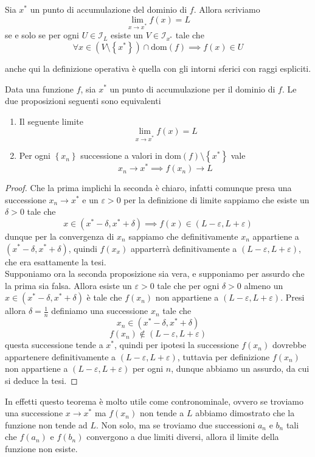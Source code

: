 \documentclass[11pt]{scrartcl}
\begin{document}
	\begin{definition}
		Sia $x^*$ un punto di accumulazione del dominio di $f$. Allora scriviamo 
		$$\lim_{x\to x^*}f(x)=L$$
		se e solo se per ogni $U\in\mathcal{I}_{L}$ esiste un $V\in \mathcal{I}_{x^*}$ tale che 
		$$\forall x\in (V\setminus\left\{x^*\right\})\cap \text{dom}(f) \implies f(x)\in U$$
	\end{definition}
	anche qui la definizione operativa è quella con gli intorni sferici con raggi espliciti. 
	\begin{theorem}\label{limite di funzione dai limiti di successione}
		Data una funzione $f$, sia $x^*$ un punto di accumulazione per il dominio di $f$. Le due proposizioni seguenti sono equivalenti
		\begin{enumerate}
			\item Il seguente limite 
			$$\lim_{x\to x^*}f(x)=L$$
			\item Per ogni $\left\{x_n\right\}$ successione a valori in $\text{dom}(f)\setminus\left\{x^*\right\}$ vale
			$$x_n\to x^* \implies f(x_n)\to L$$
		\end{enumerate}
	\end{theorem}
	\begin{proof}
		Che la prima implichi la seconda è chiaro, infatti comunque presa una successione $x_n\to x^*$ e un $\varepsilon>0$ per la definizione di limite sappiamo che esiste un $\delta>0$ tale che 
		$$x\in (x^*-\delta,x^*+\delta) \implies f(x)\in (L-\varepsilon,L+\varepsilon)$$
		dunque per la convergenza di $x_n$ sappiamo che definitivamente $x_n$ appartiene a $(x^*-\delta,x^*+\delta)$, quindi $f(x_x)$ apparterrà definitivamente a $(L-\varepsilon,L+\varepsilon)$, che era esattamente la tesi. \\
		Supponiamo ora la seconda proposizione sia vera, e supponiamo per assurdo che la prima sia falsa. Allora esiste un $\varepsilon>0$ tale che per ogni $\delta>0$ almeno un $x\in (x^*-\delta,x^*+\delta)$ è tale che $f(x_n)$ non appartiene a $(L-\varepsilon,L+\varepsilon)$. Presi allora $\delta=\frac{1}{n}$ definiamo una successione $x_n$ tale che
		$$x_n\in \left(x^*-\delta,x^*+\delta\right)$$
		$$f(x_n)\not\in (L-\varepsilon,L+\varepsilon)$$
		questa successione tende a $x^*$, quindi per ipotesi la successione $f(x_n)$ dovrebbe appartenere definitivamente a $(L-\varepsilon,L+\varepsilon)$, tuttavia per definizione $f(x_n)$ non appartiene a $(L-\varepsilon,L+\varepsilon)$ per ogni $n$, dunque abbiamo un assurdo, da cui si deduce la tesi. 
	\end{proof}
	In effetti questo teorema è molto utile come contronominale, ovvero se troviamo una successione $x\to x^*$ ma $f(x_n)$ non tende a $L$ abbiamo dimostrato che la funzione non tende ad $L$. Non solo, ma se troviamo due successioni $a_n$ e $b_n$ tali che $f(a_n)$ e $f(b_n)$ convergono a due limiti diversi, allora il limite della funzione non esiste.
	
\end{document}
